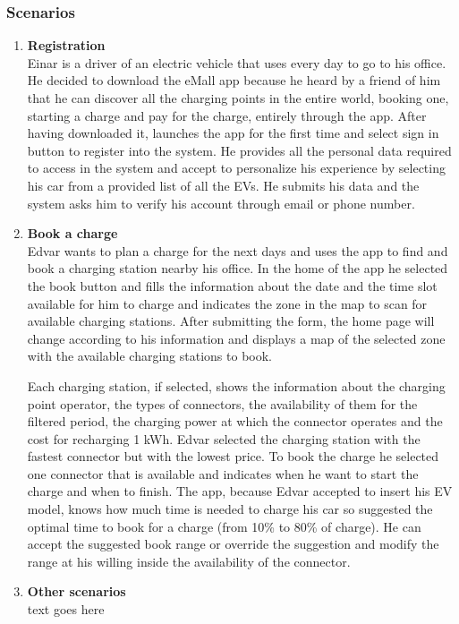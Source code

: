 \subsubsection{Scenarios}
\begin{enumerate}[label=\textbf{\Alph*}.]
      \item \textbf{Registration} \\
            Einar is a driver of an electric vehicle that uses every day to go to his
            office. He decided to download the eMall app because he heard by a friend
            of him that he can discover all the charging points in the entire world,
            booking one, starting a charge and pay for the charge, entirely through
            the app. After having downloaded it, launches the app for the first time
            and select sign in button to register into the system. He provides all
            the personal data required to access in the system and accept to personalize
            his experience by selecting his car from a provided list of all the EVs.
            He submits his data and the system asks him to verify his account through email or phone number.
      \item \textbf{Book a charge} \\
            Edvar wants to plan a charge for the next days and uses the app to find and book a charging
            station nearby his office. In the home of the app he selected the book button and fills the
            information about the date and the time slot available for him to charge and indicates the
            zone in the map to scan for available charging stations. After submitting the form, the home page
            will change according to his information and displays a map of the selected zone with the available
            charging stations to book.

            Each charging station, if selected, shows the information about the charging point operator,
            the types of connectors, the availability of them for the filtered period,
            the charging power at which the connector operates and the cost for recharging 1 kWh.
            Edvar selected the charging station with the fastest connector but with the lowest price.
            To book the charge he selected one connector that is available and indicates when he want to start the charge
            and when to finish.
            The app, because Edvar accepted to insert his EV model, knows how much time is needed to charge his car so suggested
            the optimal time to book for a charge (from 10\% to 80\% of charge).
            He can accept the suggested book range or override the suggestion and modify the range at his willing inside the
            availability of the connector.
      \item \textbf{Other scenarios} \\
            text goes here
\end{enumerate}

